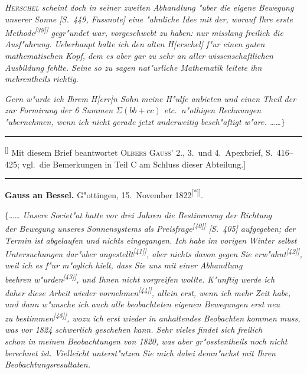 \documentclass[12pt,a4paper]{article}
\theoremstyle{plain}
\theoremstyle{definition}
\theoremstyle{remark}
\begin{document}
{\itshape \textsc{Herschel} scheint doch in seiner zweiten Abhandlung "uber die eigene Bewegung unserer Sonne [S.\ 449, Fussnote] eine "ahnliche Idee mit der, worauf Ihre erste Methode\textsuperscript{[39]]} gegr"undet war, vorgeschwebt zu haben: nur misslang freilich die Ausf"uhrung. Ueberhaupt halte ich den alten H[erschel] f"ur einen guten mathematischen Kopf, dem es aber gar zu sehr an aller wissenschaftlichen Ausbildung fehlte. Seine so zu sagen nat"urliche Mathematik leitete ihn mehrentheils richtig.}

{\itshape Gern w"urde ich Ihrem H[err]n Sohn meine H"ulfe anbieten und einen Theil der zur Formirung der 6 Summen $\Sigma(bb + cc)$ etc.\ n"othigen Rechnungen "ubernehmen, wenn ich nicht gerade jetzt anderweitig besch"aftigt w"are. \ldots{}\ldots{}$\}$}

\rule{\textwidth}{0.4pt}
{\small
\textsuperscript{[\textdagger]} Mit diesem Brief beantwortet \textsc{Olbers} \textsc{Gauss}' 2., 3.\ und 4.\ Apexbrief, S.\ 416--425; vgl.\ die Bemerkungen in Teil C am Schluss dieser Abteilung.]
}
\rule{\textwidth}{0.4pt}

\vspace{1em}
\begin{center}
\textbf{Gauss an Bessel.} \quad G"ottingen, 15.\ November 1822\textsuperscript{[*]]}.
\end{center}

\noindent
$\{$\ldots{}\ldots{} {\itshape Unsere Societ"at hatte vor drei Jahren die Bestimmung der Richtung} \\ {\itshape der Bewegung unseres Sonnensystems als Preisfrage\textsuperscript{[40]]} [S.\ 405] aufgegeben;} {\itshape der Termin ist abgelaufen und nichts eingegangen. Ich habe im vorigen} {\itshape Winter selbst Untersuchungen dar"uber angestellt\textsuperscript{[41]]}, aber nichts davon gegen} {\itshape Sie erw"ahnt\textsuperscript{[42]]}, weil ich es f"ur m"oglich hielt, dass Sie uns mit einer Abhandlung} \\ {\itshape beehren w"urden\textsuperscript{[43]]}, und Ihnen nicht vorgreifen wollte. K"unftig werde ich} \\ {\itshape daher diese Arbeit wieder vornehmen\textsuperscript{[44]]}, allein erst, wenn ich mehr Zeit habe,} \\ {\itshape und dann w"unsche ich auch alle beobachteten eigenen Bewegungen erst neu} \\ {\itshape zu bestimmen\textsuperscript{[45]]}, wozu ich erst wieder in anhaltendes Beobachten kommen muss,} \\ {\itshape was vor 1824 schwerlich geschehen kann. Sehr vieles findet sich freilich} \\ {\itshape schon in meinen Beobachtungen von 1820, was aber gr"osstentheils noch nicht} \\ {\itshape berechnet ist. Vielleicht unterst"utzen Sie mich dabei demn"achst mit Ihren} \\ {\itshape Beobachtungsresultaten.}
\end{document}
